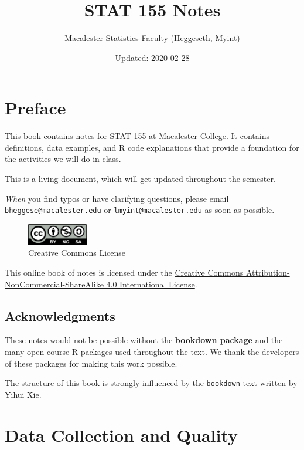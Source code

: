 \documentclass[]{book}
\title{STAT 155 Notes}
\author{Macalester Statistics Faculty (Heggeseth, Myint)}
\date{Updated: 2020-02-28}
\begin{document}
\maketitle

{
\setcounter{tocdepth}{2}
\tableofcontents
}
\hypertarget{preface}{%
\chapter*{Preface}\label{preface}}


This book contains notes for STAT 155 at Macalester College. It contains definitions, data examples, and R code explanations that provide a foundation for the activities we will do in class.

This is a living document, which will get updated throughout the semester.

\emph{When} you find typos or have clarifying questions, please email \href{mailto:bheggese@macalester.edu}{\nolinkurl{bheggese@macalester.edu}} or \href{mailto:lmyint@macalester.edu}{\nolinkurl{lmyint@macalester.edu}} as soon as possible.

\begin{figure}
\centering
\includegraphics[width=1.04167in,height=\textheight]{Photos/by-nc-sa.png}
\caption{Creative Commons License}
\end{figure}

This online book of notes is licensed under the \href{http://creativecommons.org/licenses/by-nc-sa/4.0/}{Creative Commons Attribution-NonCommercial-ShareAlike 4.0 International License}.

\hypertarget{acknowledgments}{%
\section*{Acknowledgments}\label{acknowledgments}}


These notes would not be possible without the \textbf{bookdown package} and the many open-course R packages used throughout the text. We thank the developers of these packages for making this work possible.

The structure of this book is strongly influenced by the \href{https://bookdown.org/yihui/bookdown}{\texttt{bookdown} text} written by Yihui Xie.

\hypertarget{data-collection-and-quality}{%
\chapter{Data Collection and Quality}\label{data-collection-and-quality}}
\end{document}
